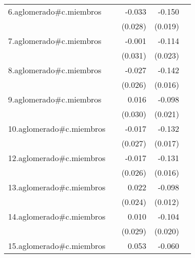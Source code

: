 {\begin{longtable}{l*{4}{D{.}{.}{-1}}}
\addlinespace
6.aglomerado#c.miembros&                     &      -0.033         &      -0.150\sym{***}&                     \\
            &                     &     (0.028)         &     (0.019)         &                     \\
\addlinespace
7.aglomerado#c.miembros&                     &      -0.001         &      -0.114\sym{***}&                     \\
            &                     &     (0.031)         &     (0.023)         &                     \\
\addlinespace
8.aglomerado#c.miembros&                     &      -0.027         &      -0.142\sym{***}&                     \\
            &                     &     (0.026)         &     (0.016)         &                     \\
\addlinespace
9.aglomerado#c.miembros&                     &       0.016         &      -0.098\sym{***}&                     \\
            &                     &     (0.030)         &     (0.021)         &                     \\
\addlinespace
10.aglomerado#c.miembros&                     &      -0.017         &      -0.132\sym{***}&                     \\
            &                     &     (0.027)         &     (0.017)         &                     \\
\addlinespace
12.aglomerado#c.miembros&                     &      -0.017         &      -0.131\sym{***}&                     \\
            &                     &     (0.026)         &     (0.016)         &                     \\
\addlinespace
13.aglomerado#c.miembros&                     &       0.022         &      -0.098\sym{***}&                     \\
            &                     &     (0.024)         &     (0.012)         &                     \\
\addlinespace
14.aglomerado#c.miembros&                     &       0.010         &      -0.104\sym{***}&                     \\
            &                     &     (0.029)         &     (0.020)         &                     \\
\addlinespace
15.aglomerado#c.miembros&                     &       0.053         &      -0.060\sym{**} &                     \\

\end{longtable}}
